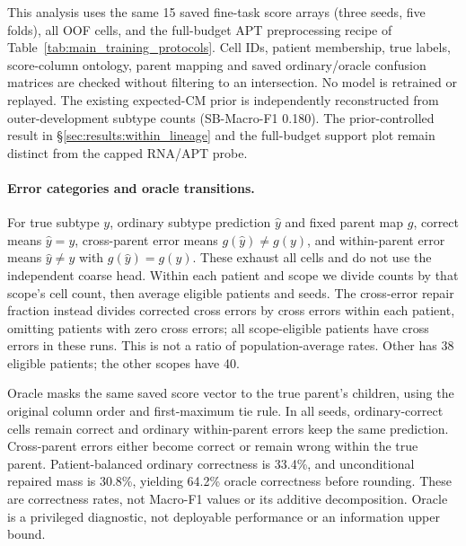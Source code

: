 This analysis uses the same 15 saved fine-task score arrays (three seeds,
five folds), all \numcells{} OOF cells, and the full-budget APT preprocessing
recipe of Table~\ref{tab:main_training_protocols}. Cell IDs, patient membership,
true labels, score-column ontology, parent mapping and saved ordinary/oracle
confusion matrices are checked without filtering to an intersection. No
model is retrained or replayed. The existing expected-CM prior is independently
reconstructed from outer-development subtype counts (SB-Macro-F1 0.180).
The prior-controlled result in \S\ref{sec:results:within_lineage} and the
full-budget support plot remain distinct from the capped RNA/APT probe.

\paragraph{Error categories and oracle transitions.}
For true subtype $y$, ordinary subtype prediction $\hat y$ and fixed parent
map $g$, correct means $\hat y=y$, cross-parent error means
$g(\hat y)\ne g(y)$, and within-parent error means $\hat y\ne y$ with
$g(\hat y)=g(y)$. These exhaust all cells and do not use the independent
coarse head. Within each patient and scope we divide counts by that scope's
cell count, then average eligible patients and seeds. The cross-error repair
fraction instead divides corrected cross errors by cross errors within each
patient, omitting patients with zero cross errors; all scope-eligible patients
have cross errors in these runs. This is not a ratio of population-average
rates. Other has 38 eligible patients; the other scopes have 40.

Oracle masks the same saved score vector to the true parent's children,
using the original column order and first-maximum tie rule. In all seeds,
ordinary-correct cells remain correct and ordinary within-parent errors keep
the same prediction. Cross-parent errors either become correct or remain
wrong within the true parent. Patient-balanced ordinary correctness is 33.4\%,
and unconditional repaired mass is 30.8\%, yielding 64.2\% oracle correctness
before rounding. These are correctness rates, not Macro-F1 values or its
additive decomposition. Oracle is a privileged diagnostic, not deployable
performance or an information upper bound.



